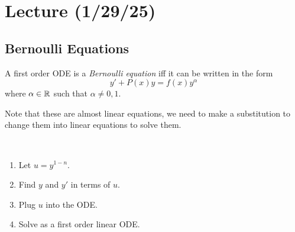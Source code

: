\documentclass[notes]{subfiles}
\begin{document}
\setcounter{section}{5}
\section{Lecture (1/29/25)}

\subsection{Bernoulli Equations}
\begin{definition}
    A first order ODE is a \textit{Bernoulli equation} iff it can be written in the form
    \[
        y' + P(x)y = f(x)y^\alpha
    \]
    where $\alpha \in \mathbb{R}$ such that $\alpha \neq 0, 1$.
\end{definition}
Note that these are almost linear equations, we need to make a substitution to change them into linear equations to solve them.
\begin{procedure} ~\par
    \begin{enumerate}[label = (\arabic*)]
        \item Let $u = y^{1 - n}$.
        \item Find $y$ and $y'$ in terms of $u$.
        \item Plug $u$ into the ODE.
        \item Solve as a first order linear ODE.
    \end{enumerate}
\end{procedure}
\end{document}
